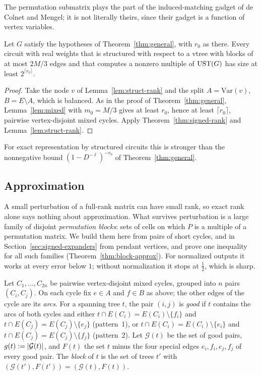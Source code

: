 The permutation submatrix plays the part of the induced-matching gadget of de Colnet and Mengel; it is not literally theirs, since their gadget is a function of vertex variables.

\begin{corollary}\label{cor:signed-exact}
Let $G$ satisfy the hypotheses of Theorem~\ref{thm:general}, with $r_0$ as there. Every circuit with real weights that is structured with respect to a vtree with blocks of at most $2M/3$ edges and that computes a nonzero multiple of $\mathrm{UST}(G)$ has size at least $2^{\lceil r_0\rceil}$.
\end{corollary}

\begin{proof}
Take the node $v$ of Lemma~\ref{lem:struct-rank} and the split $A=\mathrm{Var}(v)$, $B=E\setminus A$, which is balanced. As in the proof of Theorem~\ref{thm:general}, Lemma~\ref{lem:mixed} with $m_0=M/3$ gives at least $r_0$, hence at least $\lceil r_0\rceil$, pairwise vertex-disjoint mixed cycles. Apply Theorem~\ref{thm:signed-rank} and Lemma~\ref{lem:struct-rank}.
\end{proof}

For exact representation by structured circuits this is stronger than the nonnegative bound $(1-D^{-\ell})^{-r_0}$ of Theorem~\ref{thm:general}.

\subsection{Approximation}\label{sec:signed-approx}

A small perturbation of a full-rank matrix can have small rank, so exact rank alone says nothing about approximation. What survives perturbation is a large family of disjoint \emph{permutation blocks}: sets of cells on which $P$ is a multiple of a permutation matrix. We build them here from pairs of short cycles, and in Section~\ref{sec:signed-expanders} from pendant vertices, and prove one inequality for all such families (Theorem~\ref{thm:block-approx}). For normalized outputs it works at every error below $1$; without normalization it stops at $\frac12$, which is sharp.

Let $C_1,\dots,C_{2n}$ be pairwise vertex-disjoint mixed cycles, grouped into $n$ pairs $(C_i,C_j)$. On each cycle fix $e\in A$ and $f\in B$ as above; the other edges of the cycle are its \emph{arcs}. For a spanning tree $t$, the pair $(i,j)$ is \emph{good} if $t$ contains the arcs of both cycles and either $t\cap E(C_i)=E(C_i)\setminus\{f_i\}$ and $t\cap E(C_j)=E(C_j)\setminus\{e_j\}$ (pattern~1), or $t\cap E(C_i)=E(C_i)\setminus\{e_i\}$ and $t\cap E(C_j)=E(C_j)\setminus\{f_j\}$ (pattern~2). Let $\mathcal G(t)$ be the set of good pairs, $g(t):=\lvert \mathcal G(t)\rvert$, and $F(t)$ the set $t$ minus the four special edges $e_i,f_i,e_j,f_j$ of every good pair. The \emph{block} of $t$ is the set of trees $t'$ with $(\mathcal G(t'),F(t'))=(\mathcal G(t),F(t))$.

